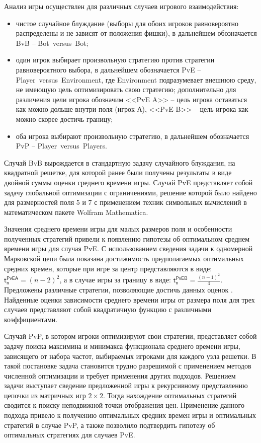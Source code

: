 Анализ игры осуществлен для различных случаев игрового взаимодействия: 
\begin{itemize}
    \item чистое случайное блуждание (выборы для обоих игроков равновероятно распределены и не зависят от положения фишки), в дальнейшем обозначается BvB -- Bot~versus~Bot;
    \item один игрок выбирает произвольную стратегию против стратегии равновероятного выбора, в дальнейшем обозначается PvE -- Player~versus~Environment, где Environment подразумевает внешнюю среду, не имеющую цель оптимизировать свою стратегию; дополнительно для различения цели игрока обозначим <<PvE A>> -- цель игрока оставаться как можно дольше внутри поля (игрок А), <<PvE B>> -- цель игрока как можно скорее достичь границу;
    \item оба игрока выбирают произвольную стратегию, в дальнейшем обозначается PvP -- Player~versus~Players.
\end{itemize}
Случай BvB вырождается в стандартную задачу случайного блуждания, на квадратной решетке, для которой ранее были получены результаты в виде двойной суммы оценки среднего времени игры. Случай PvE представляет собой задачу глобальной оптимизации с ограничениями, решение которой было найдено для размерностей поля $5$ и $7$ с применением техник символьных вычислений в математическом пакете Wolfram Mathematica. 

Значения среднего времени игры для малых размеров поля и особенности полученных стратегий привели к появлению гипотезы об оптимальном среднем времени игры для случая PvE. С использованием сведения задачи к одномерной Марковской цепи была показана достижимость предполагаемых оптимальных средних времен, которые при игре за центр представляются в виде: $\boldsymbol{\mathsf{t_n^{PvE A}}} = (n-2)^2$, а в случае игры за границу в виде: $\boldsymbol{\mathsf{t_n^{PvE B}}} = \frac{(n-1)^2}{4}$. Предложены различные стратегии, позволяющие достичь данных оценок \cite{confbib1}. Найденные оценки зависимости среднего времени игры от размера поля для трех случаев представляют собой квадратичную функцию с различными коэффициентами.

Случай PvP, в котором игроки оптимизируют свои стратегии, представляет собой задачу поиска максимина и минимакса функционала среднего времени игры, зависящего от набора частот, выбираемых игроками для каждого узла решетки. В такой постановке задача становится трудно разрешимой с применением методов численной оптимизации и требует применения других подходов. Решением задачи выступает сведение предложенной игры к рекурсивному представлению цепочки из матричных игр $2 \times 2$. Тогда нахождение оптимальных стратегий сводится к поиску неподвижной точки отображения цен. Применение данного подхода привело к получению оптимальных средних времен игры и оптимальных стратегий в случае PvP, а также позволило подтвердить гипотезу об оптимальных стратегиях для случаев PvE.

